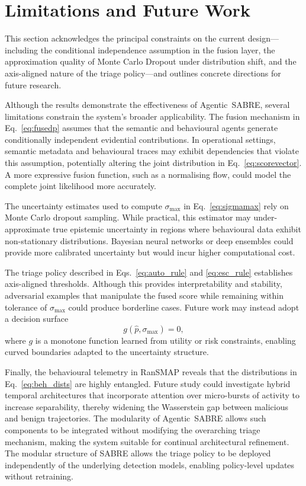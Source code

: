 \documentclass[lettersize,journal]{IEEEtran}
\begin{document}
\section{Limitations and Future Work}
\label{sec:limitations}

This section acknowledges the principal constraints on the current design---including the
conditional independence assumption in the fusion layer, the approximation quality of Monte
Carlo Dropout under distribution shift, and the axis-aligned nature of the triage
policy---and outlines concrete directions for future research.

Although the results demonstrate the effectiveness of Agentic~SABRE, several limitations constrain the system’s broader applicability. The fusion mechanism in Eq.~\eqref{eq:fusedp} assumes that the semantic and behavioural agents generate conditionally independent evidential contributions. In operational settings, semantic metadata and behavioural traces may exhibit dependencies that violate this assumption, potentially altering the joint distribution in Eq.~\eqref{eq:scorevector}. A more expressive fusion function, such as a normalising flow, could model the complete joint likelihood more accurately.

The uncertainty estimates used to compute \(\sigma_{\max}\) in Eq.~\eqref{eq:sigmamax} rely on Monte Carlo dropout sampling. While practical, this estimator may under-approximate true epistemic uncertainty in regions where behavioural data exhibit non-stationary distributions. Bayesian neural networks or deep ensembles could provide more calibrated uncertainty but would incur higher computational cost.

The triage policy described in Eqs.~\eqref{eq:auto_rule} and \eqref{eq:esc_rule} establishes axis-aligned thresholds. Although this provides interpretability and stability, adversarial examples that manipulate the fused score while remaining within tolerance of \(\sigma_{\max}\) could produce borderline cases. Future work may instead adopt a decision surface
\begin{equation}
g(\hat{p},\sigma_{\max}) = 0,
\label{eq:nonlinear_boundary}
\end{equation}
where \(g\) is a monotone function learned from utility or risk constraints, enabling curved boundaries adapted to the uncertainty structure.

Finally, the behavioural telemetry in RanSMAP reveals that the distributions in Eq.~\eqref{eq:beh_dists} are highly entangled. Future study could investigate hybrid temporal architectures that incorporate attention over micro-bursts of activity to increase separability, thereby widening the Wasserstein gap between malicious and benign trajectories. The modularity of Agentic~SABRE allows such components to be integrated without modifying the overarching triage mechanism, making the system suitable for continual architectural refinement.
The modular structure of SABRE allows the triage policy to be deployed independently of the underlying detection models, enabling policy-level updates without retraining.
\end{document}
